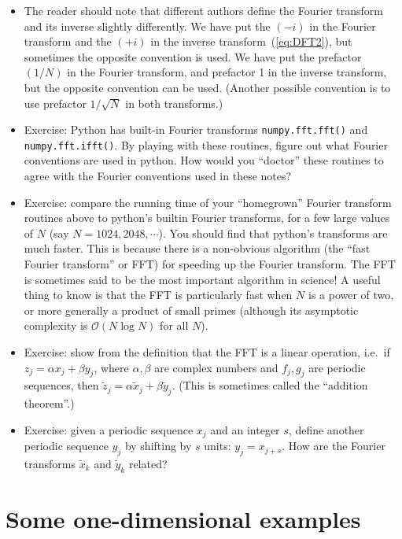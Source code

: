 \documentclass[aps,prd,superscriptaddress,groupedaddress,nofootinbib,nobibnotes]{revtex4}
\def\bigoh{{\mathcal O}}
\begin{document}
\begin{itemize}
\item The reader should note that different authors define the Fourier transform and its inverse slightly differently.
 We have put the $(-i)$ in the Fourier transform and the $(+i)$ in the inverse transform~(\ref{eq:DFT2}),
 but sometimes the opposite convention is used.  We have put the prefactor $(1/N)$ in the Fourier transform,
 and prefactor 1 in the inverse transform, but the opposite convention can be used.  (Another possible convention is
 to use prefactor $1/\sqrt{N}$ in both transforms.)

\item Exercise: Python has built-in Fourier transforms {\tt numpy.fft.fft()} and {\tt numpy.fft.ifft()}.
 By playing with these routines, figure out what Fourier conventions are used in python.
 How would you ``doctor'' these routines to agree with the Fourier conventions used in these notes?

\item Exercise: compare the running time of your ``homegrown'' Fourier transform routines above to python's
 builtin Fourier transforms, for a few large values of $N$ (say $N=1024, 2048, \cdots$).  You should find that
 python's transforms are much faster.  This is because there is a non-obvious algorithm (the ``fast Fourier
 transform'' or FFT) for speeding up the Fourier transform.  The FFT is sometimes said to be the most important
 algorithm in science!  A useful thing to know is that the FFT is particularly fast when $N$ is a power of two,
 or more generally a product of small primes (although its asymptotic complexity is $\bigoh(N \log N)$ for all $N$).

\item Exercise: show from the definition that the FFT is a linear operation, i.e.~if $z_j = \alpha x_j + \beta y_j$,
 where $\alpha,\beta$ are complex numbers and $f_j,g_j$ are periodic sequences, then 
 $\tilde z_j = \alpha \tilde x_j + \beta \tilde y_j$.  (This is sometimes called the ``addition theorem''.)

\item Exercise: given a periodic sequence $x_j$ and an integer $s$, define another periodic sequence $y_j$ by
 shifting by $s$ units: $y_j = x_{j+s}$.  How are the Fourier transforms $\tilde x_k$ and $\tilde y_k$ related?

\end{itemize}

\section{Some one-dimensional examples}
\end{document}
